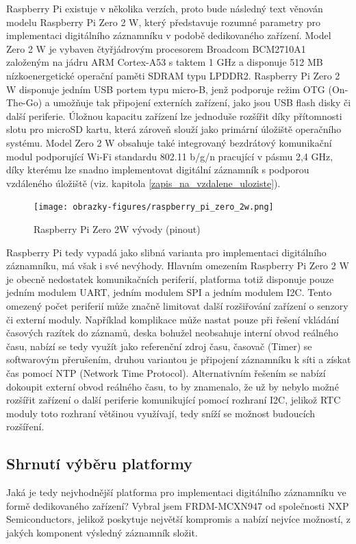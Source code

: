 Raspberry Pi existuje v několika verzích, proto bude následný text věnován modelu Raspberry Pi Zero 2 W, který představuje rozumné parametry pro implementaci digitálního záznamníku v podobě dedikovaného zařízení. Model Zero 2 W je vybaven čtyřjádrovým procesorem Broadcom BCM2710A1 založeným na jádru ARM Cortex-A53 s taktem 1 GHz a disponuje 512 MB nízkoenergetické operační paměti SDRAM typu LPDDR2. Raspberry Pi Zero 2 W disponuje jedním USB portem typu micro-B, jenž podporuje režim OTG (On-The-Go) a umožňuje tak připojení externích zařízení, jako jsou USB flash disky či další periferie. Úložnou kapacitu zařízení lze jednoduše rozšířit díky přítomnosti slotu pro microSD kartu, která zároveň slouží jako primární úložiště operačního systému. Model Zero 2 W obsahuje také integrovaný bezdrátový komunikační modul podporující Wi-Fi standardu 802.11 b/g/n pracující v pásmu 2,4 GHz, díky kterému lze snadno implementovat digitální záznamník s podporou vzdáleného úložiště (viz. kapitola \ref{zapis_na_vzdalene_uloziste}).

\begin{figure}[h]
    \centering
    \texttt{[image: obrazky-figures/raspberry\_pi\_zero\_2w.png]}
    
    \caption{Raspberry Pi Zero 2W vývody (pinout) \cite{arduino_shop_due}}
    \label{fig:raspberry-pi-zero-2w}
\end{figure}

Raspberry Pi tedy vypadá jako slibná varianta pro implementaci digitálního záznamníku, má však i své nevýhody. Hlavním omezením Raspberry Pi Zero 2 W je obecně nedostatek komunikačních periferií, platforma totiž disponuje pouze jedním modulem UART, jedním modulem SPI a jedním modulem I2C. 
Tento omezený počet periferií může značně limitovat další rozšiřování zařízení o senzory či externí moduly. Například komplikace může nastat pouze při řešení vkládání časových razítek do záznamů, deska bohužel neobsahuje interní obvod reálného času, nabízí se  tedy využít jako referenční zdroj času, časovač (Timer) se softwarovým přerušením, druhou variantou je připojení záznamníku k síti a získat čas pomocí NTP (Network Time Protocol). Alternativním řešením se nabízí dokoupit externí obvod reálného času, to by znamenalo, že už by nebylo možné rozšířit zařízení o další periferie komunikující pomocí rozhraní I2C, jelikož RTC moduly toto rozhraní většinou využívají, tedy sníží se možnost budoucích rozšíření.

\subsection{Shrnutí výběru platformy}
Jaká je tedy nejvhodnější platforma pro implementaci digitálního záznamníku ve formě dedikovaného zařízení? Vybral jsem FRDM-MCXN947 od společnosti NXP Semiconductors, jelikož poskytuje největší kompromis a nabízí nejvíce možností, z jakých komponent výsledný záznamník složit.

